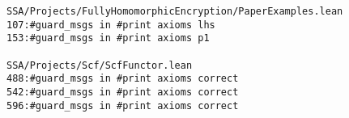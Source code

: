 \documentclass{sigplanconf}
\begin{document}
\begin{verbatim}
SSA/Projects/FullyHomomorphicEncryption/PaperExamples.lean
107:#guard_msgs in #print axioms lhs
153:#guard_msgs in #print axioms p1

SSA/Projects/Scf/ScfFunctor.lean
488:#guard_msgs in #print axioms correct
542:#guard_msgs in #print axioms correct
596:#guard_msgs in #print axioms correct
\end{verbatim}




\end{document}
